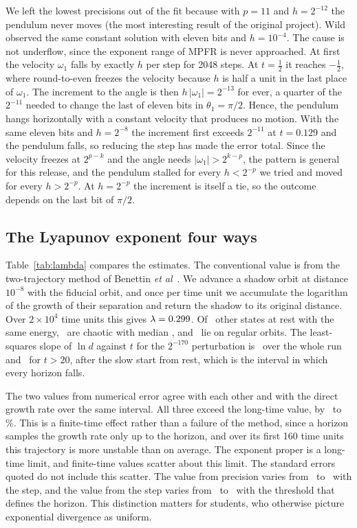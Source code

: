 \documentclass[12pt,a4paper]{article}
\begin{document}
We left the lowest precisions out of the fit because with $p=11$ and
$h=2^{-12}$ the pendulum never moves (the most interesting result of the
original project). Wild~\cite{wild2019} observed the same constant solution
with eleven bits and $h=10^{-4}$. The cause is not underflow, since the exponent
range of MPFR is never approached. At first the velocity $\omega_1$ falls by
exactly $h$ per step for 2048 steps. At $t=\tfrac12$ it reaches $-\tfrac12$,
where round-to-even freezes the velocity because $h$ is half a unit in the last
place of $\omega_1$. The increment to the angle is then $h\,|\omega_1|=2^{-13}$
for ever, a quarter of the $2^{-11}$ needed to change the last of eleven bits in
$\theta_1=\pi/2$. Hence, the pendulum hangs horizontally with a constant
velocity that produces no motion. With the same eleven bits and $h=2^{-8}$ the
increment first exceeds $2^{-11}$ at $t=0.129$ and the pendulum falls, so
reducing the step has made the error total. Since the velocity freezes at
$2^{p-k}$ and the angle needs $|\omega_1|>2^{k-p}$, the pattern is general for
this release, and the pendulum stalled for every $h<2^{-p}$ we tried and moved
for every $h>2^{-p}$. At $h=2^{-p}$ the increment is itself a tie, so the
outcome depends on the last bit of $\pi/2$.

\subsection{The Lyapunov exponent four ways}

Table~\ref{tab:lambda} compares the estimates. The conventional value is from
the two-trajectory method of Benettin
\textit{et al}~\cite{benettin1976,wolf1985}. We advance a shadow orbit at
distance $10^{-8}$ with the fiducial orbit, and once per time unit we
accumulate the logarithm of the growth of their separation and return the
shadow to its original distance. Over $2\times10^4$ time units this gives
$\lambda=0.299$. Of \nEns\ other states at rest with the same energy,
\nChaotic\ are chaotic with median \lamBenEns, and \nReg\ lie on regular orbits.
The least-squares slope of $\ln d$ against $t$ for the $2^{-170}$ perturbation
is \lamDir\ over the whole run and \lamDirWin\ for $t>20$, after the slow start
from rest, which is the interval in which every horizon falls.

The two values from numerical error agree with each other and with the direct
growth rate over the same interval. All three exceed the long-time value, by
\lamExcessLo\ to \lamExcessHi\%. This is a finite-time effect rather than a
failure of the method, since a horizon samples the growth rate only up to the
horizon, and over its first 160 time units this trajectory is more unstable
than on average. The exponent proper is a long-time limit, and finite-time
values scatter about this limit. The standard errors quoted do not include this
scatter. The value from precision varies from \lamPrecCoarse\ to \lamPrec\ with
the step, and the value from the step varies from \lamStepThrLo\ to
\lamStepThrHi\ with the threshold that defines the horizon. This distinction
matters for students, who otherwise picture exponential divergence as uniform.
\end{document}
